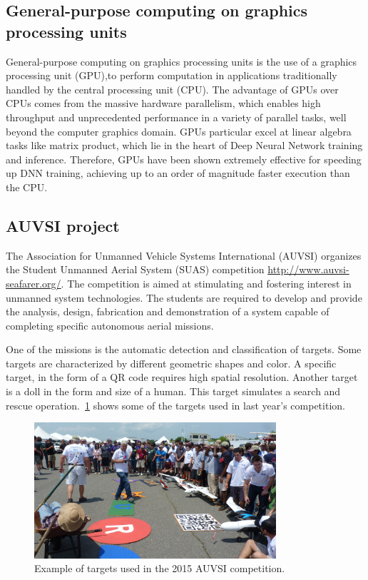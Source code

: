 \documentclass{article} %
\begin{document}
\subsection{General-purpose computing on graphics processing units}

General-purpose computing on graphics processing units is the use of a graphics
processing unit (GPU),to perform computation in applications traditionally
handled by the central processing unit (CPU). The advantage of GPUs over  CPUs
comes from the massive hardware parallelism, which enables high throughput and
unprecedented performance in a variety of parallel tasks, well beyond the
computer graphics domain. GPUs particular excel at linear algebra tasks like
matrix product, which lie in the heart of Deep Neural Network training and
inference. Therefore,  GPUs have been shown extremely effective for speeding up
DNN training, achieving  up to an order of magnitude  faster execution than the
CPU.

\subsection{AUVSI project}

The Association for Unmanned Vehicle Systems International (AUVSI) organizes the
Student Unmanned Aerial System (SUAS) competition
\url{http://www.auvsi-seafarer.org/}. The competition is aimed  at stimulating
and fostering interest in unmanned system technologies. The  students  are
required  to  develop  and  provide  the  analysis, design, fabrication and
demonstration of a system capable of completing specific autonomous aerial
missions.

One of the missions is the automatic detection and classification of targets.
Some targets are characterized by different geometric shapes and color. A specific
target, in the form of a QR code requires high spatial resolution. Another
target is a doll in the form and size of a human. This target simulates a search
and rescue operation.~\cref{fig:targets} shows some of the targets used in last
year's competition.
\begin{figure}[h]
	\centering
	\includegraphics[width=0.8\textwidth]{auvsi_targets}
	\caption{Example of targets used in the 2015 AUVSI competition.}
	\label{fig:targets}
\end{figure}
\end{document}
